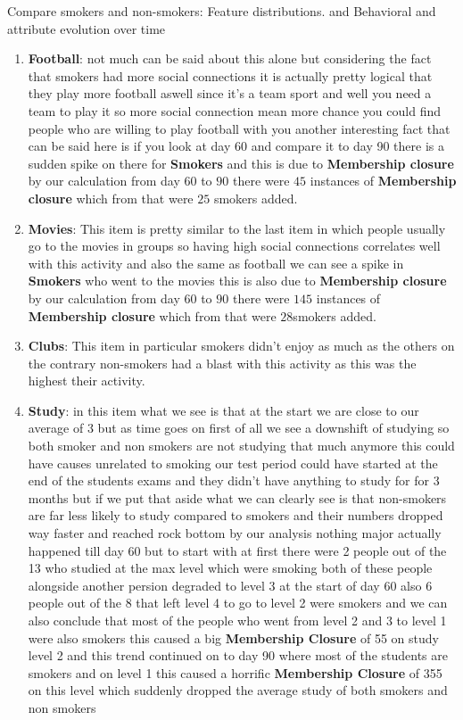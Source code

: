 \begin{question}
\begin{subquestion}{Compare smokers and non-smokers: Feature distributions. and Behavioral and attribute evolution over time}
{\begin{enumerate}
			\item  \textbf{Football}: not much can be said about this alone but considering the fact that smokers had more social connections it is actually pretty logical that they play more football aswell since it's a team sport and well you need a team to play it so more social connection mean more chance you could find people who are willing to play football with you another interesting fact that can be said here is if you look at day 60 and compare it to day 90 there is a sudden spike on there for \textbf{Smokers} and this is due to \textbf{Membership closure} by our calculation from day $60$ to $90$ there were $45$ instances of \textbf{Membership closure} which from that were $25$ smokers added.
			\item \textbf{Movies}: This item is pretty similar to the last item in which people usually go to the movies in groups so having high social connections correlates well with this activity and also the same as football we can see a spike in \textbf{Smokers} who went to the movies this is also due to \textbf{Membership closure} by our calculation from day $60$ to $90$ there were $145$ instances of \textbf{Membership closure} which from that were $28$smokers added.
			\item  \textbf{Clubs}:  This item in particular smokers didn't enjoy as much as the others on the contrary non-smokers had a blast with this activity as this was the highest their activity.
			\item  \textbf{Study}: in this item what we see is that at the start we are close to our average of $3$ but as time goes on first of all we see a downshift of studying so both smoker and non smokers are not studying that much anymore this could have causes unrelated to smoking our test period could have started at the end of the students exams and they didn't have anything to study for for 3 months but if we put that aside what we can clearly see is that non-smokers are far less likely to study compared to smokers and their numbers dropped way faster and reached rock bottom by our analysis nothing major actually happened till day 60 but to start with at first there were 2 people out of the 13 who studied at the max level which were smoking both of these people alongside another persion degraded to level 3 at the start of day 60 also 6 people out of the 8 that left level 4 to go to level 2 were smokers and we can also conclude that most of the people who went from level 2 and 3 to level 1 were also smokers this caused a big \textbf{Membership Closure} of 55 on study level 2 and this trend continued on to day 90 where most of the students are smokers and on level 1  this caused a horrific \textbf{Membership Closure}   of 355 on this level which suddenly dropped the average study of both smokers and non smokers

\end{enumerate}}
\end{subquestion}
\end{question}
